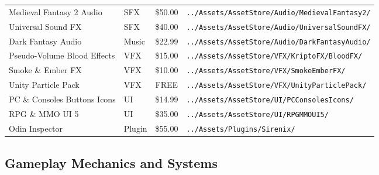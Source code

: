 \begin{table}[!h]
\begin{center}
\begin{tabular}{ >{\small}w{l}{11em} >{\small}w{c}{4em} >{\small}w{c}{3em} m{13em} }
      Medieval Fantasy 2 Audio     & SFX       &  \$50.00 & \texttt{\tiny ../Assets/AssetStore/Audio/MedievalFantasy2/} \\ 
      Universal Sound FX           & SFX       &  \$40.00 & \texttt{\tiny ../Assets/AssetStore/Audio/UniversalSoundFX/} \\
      \midrule
      Dark Fantasy Audio           & Music     &  \$22.99 & \texttt{\tiny ../Assets/AssetStore/Audio/DarkFantasyAudio/} \\
      \midrule
      Pseudo-Volume Blood Effects  & VFX       &  \$15.00 & \texttt{\tiny ../Assets/AssetStore/VFX/KriptoFX/BloodFX/}  \\ 
      Smoke \& Ember FX            & VFX       &  \$10.00 & \texttt{\tiny ../Assets/AssetStore/VFX/SmokeEmberFX/}      \\ 
      Unity Particle Pack          & VFX       &     FREE & \texttt{\tiny ../Assets/AssetStore/VFX/UnityParticlePack/} \\
      \midrule
      PC \& Consoles Buttons Icons & UI        &  \$14.99 & \texttt{\tiny ../Assets/AssetStore/UI/PCConsolesIcons/} \\ 
      RPG \& MMO UI 5              & UI        &  \$35.00 & \texttt{\tiny ../Assets/AssetStore/UI/RPGMMOUI5/}       \\
      \midrule
      Odin Inspector               & Plugin    &  \$55.00 & \texttt{\tiny ../Assets/Plugins/Sirenix/} \\ 
      \bottomrule
    \end{tabular}
  \end{center}
\end{table}

\subsection{Gameplay Mechanics and Systems}

